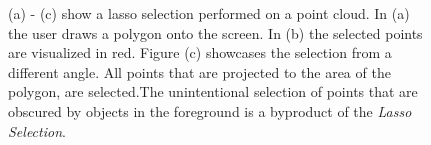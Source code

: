 \begin{figure}
\centering
{}\par\medskip
{}\par\medskip        
{}
\caption{(a) - (c) show a lasso selection performed on a point cloud. In (a) the user draws a polygon onto the screen. In (b) the selected points are visualized in red. Figure (c) showcases the selection from a different angle. All points that are projected to the area of the polygon, are selected.The unintentional selection of points that are obscured by objects in the foreground is a byproduct of the \textit{Lasso Selection}. }
\label{fig:lasso}
\end{figure}



